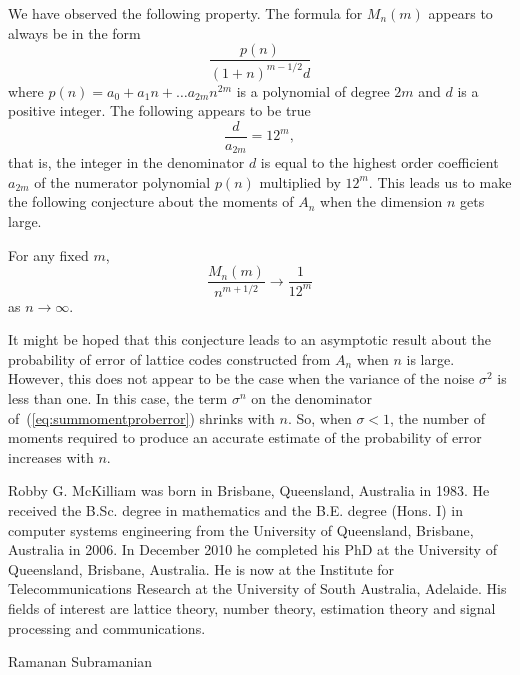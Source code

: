 \documentclass[journal]{IEEEtran}
\begin{document}
We have observed the following property.  The formula for $M_n(m)$ appears to always be in the form
\[
\frac{p(n)}{(1+n)^{m-1/2} d}
\] 
where $p(n) = a_0 + a_1n + \dots a_{2m} n^{2m}$ is a polynomial of degree $2m$ and $d$ is a positive integer.  The following appears to be true
\[
\frac{d}{a_{2m}} = 12^m,
\]
that is, the integer in the denominator $d$ is equal to the highest order coefficient $a_{2m}$ of the numerator polynomial $p(n)$ multiplied by $12^m$.  This leads us to make the following conjecture about the moments of $A_n$ when the dimension $n$ gets large.

\begin{conjecture}
For any fixed $m$,
\[
\frac{M_n(m)}{n^{m+1/2}} \rightarrow \frac{1}{12^{m}} 
\]
as $n \rightarrow \infty$.
\end{conjecture}

It might be hoped that this conjecture leads to an asymptotic result about the probability of error of lattice codes constructed from $A_n$ when $n$ is large.  However, this does not appear to be the case when the variance of the noise $\sigma^2$ is less than one.  In this case, the term $\sigma^n$ on the denominator of~(\ref{eq:summomentproberror}) shrinks with $n$.  So, when $\sigma < 1$, the number of moments required to produce an accurate estimate of the probability of error increases with $n$.

\small


\begin{IEEEbiographynophoto}{Robby G. McKilliam}
was born in Brisbane, Queensland, Australia in 1983. He received the B.Sc. degree in mathematics and the B.E. degree (Hons. I) in computer systems engineering from the University of Queensland, Brisbane, Australia in 2006.  In December 2010 he completed his PhD at the University of Queensland, Brisbane, Australia.  He is now at the Institute for Telecommunications Research at the University of South Australia, Adelaide.  His fields of interest are lattice theory, number theory, estimation theory and signal processing and communications.
\end{IEEEbiographynophoto}

\begin{IEEEbiographynophoto}{Ramanan Subramanian}
\end{IEEEbiographynophoto}
\end{document}
